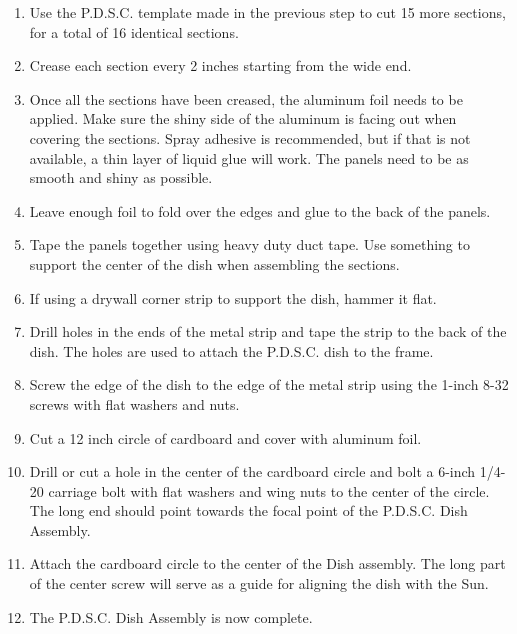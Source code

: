 \documentclass{article}
\begin{document}
            \begin{enumerate}
                \item Use the P.D.S.C. template made in the previous step to cut 15 more sections, for a total of 16 identical sections.
                \item Crease each section every 2 inches starting from the wide end.
                \item Once all the sections have been creased, the aluminum foil needs to be applied.  Make sure the shiny side of the aluminum is facing out when covering the sections. Spray adhesive is recommended, but if that is not available, a thin layer of liquid glue will work.  The panels need to be as smooth and shiny as possible.
                \item Leave enough foil to fold over the edges and glue to the back of the panels.
                \item Tape the panels together using heavy duty duct tape.  Use something to support the center of the dish when assembling the sections.
                \item If using a drywall corner strip to support the dish, hammer it flat.
                \item Drill holes in the ends of the metal strip and tape the strip to the back of the dish.  The holes are used to attach the P.D.S.C. dish to the frame.
                \item Screw the edge of the dish to the edge of the metal strip using the 1-inch 8-32 screws with flat washers and nuts.
                \item Cut a 12 inch circle of cardboard and cover with aluminum foil.
                \item Drill or cut a hole in the center of the cardboard circle and bolt a 6-inch 1/4-20 carriage bolt with flat washers and wing nuts to the center of the circle.  The long end should point towards the focal point of the P.D.S.C. Dish Assembly.
                \item Attach the cardboard circle to the center of the Dish assembly.  The long part of the center screw will serve as a guide for aligning the dish with the Sun.
                \item The P.D.S.C. Dish Assembly is now complete. 
                
            \end{enumerate}
    
\end{document}
